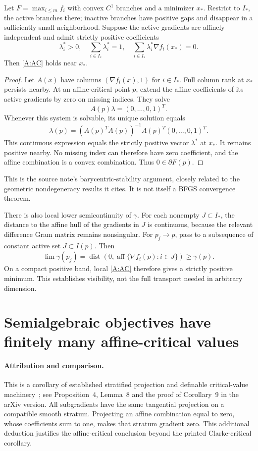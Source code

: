 Let $F=\max_{i\le m}f_i$ with convex $C^1$ branches and a minimizer $x_*$. Restrict to $I_*$, the active branches there; inactive branches have positive gaps and disappear in a sufficiently small neighborhood. Suppose the active gradients are affinely independent and admit strictly positive coefficients
\[
 \lambda_i^*>0,\quad\sum_{i\in I_*}\lambda_i^*=1,
 \quad\sum_{i\in I_*}\lambda_i^*\nabla f_i(x_*)=0.
\]
Then \eqref{A:AC} holds near $x_*$.

\begin{proof}
Let $A(x)$ have columns $(\nabla f_i(x),1)$ for $i\in I_*$. Full column rank at $x_*$ persists nearby. At an affine-critical point $p$, extend the affine coefficients of its active gradients by zero on missing indices. They solve
\[
 A(p)\lambda=(0,\ldots,0,1)^T.
\]
Whenever this system is solvable, its unique solution equals
\[
 \lambda(p)=(A(p)^TA(p))^{-1}A(p)^T(0,\ldots,0,1)^T.
\]
This continuous expression equals the strictly positive vector $\lambda^*$ at $x_*$. It remains positive nearby. No missing index can therefore have zero coefficient, and the affine combination is a convex combination. Thus $0\in\partial F(p)$.
\end{proof}
This is the source note's barycentric-stability argument, closely related to the geometric nondegeneracy results it cites. It is not itself a BFGS convergence theorem.

There is also local lower semicontinuity of $\gamma$. For each nonempty $J\subset I_*$, the distance to the affine hull of the gradients in $J$ is continuous, because the relevant difference Gram matrix remains nonsingular. For $p_j\to p$, pass to a subsequence of constant active set $J\subset I(p)$. Then
\[
 \lim\gamma(p_j)=\operatorname{dist}(0,\operatorname{aff}\{\nabla f_i(p):i\in J\})\ge\gamma(p).
\]
On a compact positive band, local \eqref{A:AC} therefore gives a strictly positive minimum. This establishes visibility, not the full transport needed in arbitrary dimension.

\section{Semialgebraic objectives have finitely many affine-critical values}
\paragraph{Attribution and comparison.}
This is a corollary of established stratified projection and definable critical-value machinery~\cite{BDLS}; see Proposition~4, Lemma~8 and the proof of Corollary~9 in the arXiv version. All subgradients have the same tangential projection on a compatible smooth stratum. Projecting an affine combination equal to zero, whose coefficients sum to one, makes that stratum gradient zero. This additional deduction justifies the affine-critical conclusion beyond the printed Clarke-critical corollary.

